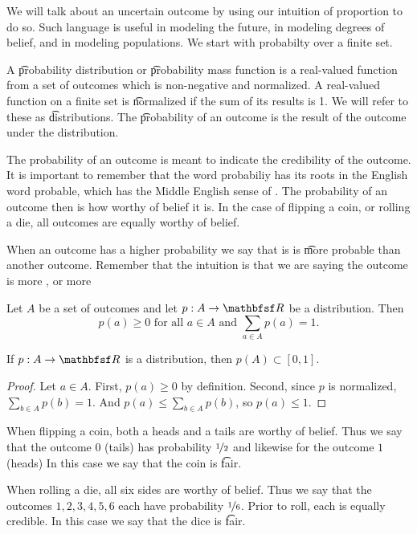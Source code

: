 

We will talk about an uncertain outcome by using our intuition of proportion to do so.
Such language is useful in modeling the future, in modeling degrees of belief, and in modeling populations.
We start with probabilty over a finite set.


A \t{probability distribution} or \t{probability mass function} is a real-valued function from a set of outcomes which is non-negative and normalized.
A real-valued function on a finite set is \t{normalized} if the sum of its results is 1.
We will refer to these as \t{distributions}.
The \t{probability of an outcome} is the result of the outcome under the distribution.

The probability of an outcome is meant to indicate the credibility of the outcome.
It is important to remember that the word probabiliy has its roots in the English word probable, which has the Middle English sense of .
The probability of an outcome then is how worthy of belief it is.
In the case of flipping a coin, or rolling a die, all outcomes are equally worthy of belief.

When an outcome has a higher probability we say that is is \t{more probable} than another outcome.
Remember that the intuition is that we are saying the outcome is more , or more 


Let $A$ be a set of outcomes and let $p: A \to \R$ be a distribution.
Then
\[
  p(a) \geq 0 \text{ for all } a \in A \text{ and } \sum_{a \in A} p(a) = 1.
\]

\begin{prop}
If $p: A \to \R$ is a distribution, then $p(A) \subset [0, 1]$.
\begin{proof}

Let $a \in A$.
First, $p(a) \geq 0$ by definition.
Second, since $p$ is normalized, $\sum_{b \in A} p(b) = 1$.
And $p(a) \leq \sum_{b \in A} p(b)$, so $p(a) \leq 1$.

\end{proof}

\end{prop}

When flipping a coin, both a heads and a tails are worthy of belief.
Thus we say that the outcome $0$ (tails) has probability $\nicefrac{1}{2}$ and likewise for the outcome $1$ (heads)
In this case we say that the coin is \t{fair}.

When rolling a die, all six sides are worthy of belief.
Thus we say that the outcomes $1, 2, 3, 4, 5, 6$ each have probability $\nicefrac{1}{6}$.
Prior to roll, each is equally credible.
In this case we say that the dice is \t{fair}.
